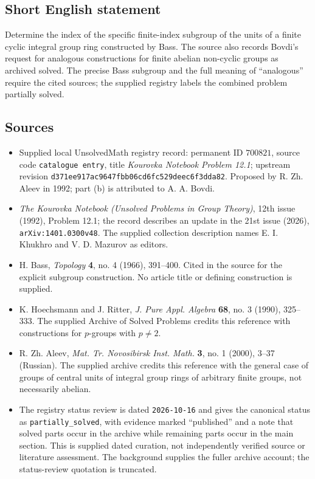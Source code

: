 \documentclass[11pt]{article}
\begin{document}
\subsection{Short English statement}
Determine the index of the specific finite-index subgroup of the units of a finite cyclic integral group ring constructed by Bass. The source also records Bovdi's request for analogous constructions for finite abelian non-cyclic groups as archived solved. The precise Bass subgroup and the full meaning of ``analogous'' require the cited sources; the supplied registry labels the combined problem partially solved.
\subsection{Sources}
\begin{itemize}
\item Supplied local UnsolvedMath registry record: permanent ID \(700821\), source code \texttt{catalogue entry}, title \emph{Kourovka Notebook Problem 12.1}; upstream revision \texttt{d371ee917ac9647fbb06cd6fc529deec6f3dda82}. Proposed by R. Zh. Aleev in 1992; part (b) is attributed to A. A. Bovdi.
\item \emph{The Kourovka Notebook (Unsolved Problems in Group Theory)}, 12th issue (1992), Problem 12.1; the record describes an update in the 21st issue (2026), \texttt{arXiv:1401.0300v48}. The supplied collection description names E. I. Khukhro and V. D. Mazurov as editors.
\item H. Bass, \emph{Topology} \textbf{4}, no. 4 (1966), 391--400. Cited in the source for the explicit subgroup construction. No article title or defining construction is supplied.
\item K. Hoechsmann and J. Ritter, \emph{J. Pure Appl. Algebra} \textbf{68}, no. 3 (1990), 325--333. The supplied Archive of Solved Problems credits this reference with constructions for \(p\)-groups with \(p\neq2\).
\item R. Zh. Aleev, \emph{Mat. Tr. Novosibirsk Inst. Math.} \textbf{3}, no. 1 (2000), 3--37 (Russian). The supplied archive credits this reference with the general case of groups of central units of integral group rings of arbitrary finite groups, not necessarily abelian.
\item The registry status review is dated \texttt{2026-10-16} and gives the canonical status as \texttt{partially\_solved}, with evidence marked ``published'' and a note that solved parts occur in the archive while remaining parts occur in the main section. This is supplied dated curation, not independently verified source or literature assessment. The background supplies the fuller archive account; the status-review quotation is truncated.
\end{itemize}
\end{document}
